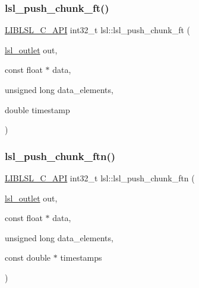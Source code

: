 \subsubsection{\texorpdfstring{lsl\+\_\+push\+\_\+chunk\+\_\+ft()}{lsl\_push\_chunk\_ft()}}
{\footnotesize\ttfamily \hyperlink{lsl__cpp_8h_aafd0ef1813e8be84a1420c4f1df64615}{L\+I\+B\+L\+S\+L\+\_\+\+C\+\_\+\+A\+PI} int32\+\_\+t lsl\+::lsl\+\_\+push\+\_\+chunk\+\_\+ft (\begin{DoxyParamCaption}\item[{\hyperlink{namespacelsl_abcf512b0f66dacf86c10b165995fd50b}{lsl\+\_\+outlet}}]{out,  }\item[{const float $\ast$}]{data,  }\item[{unsigned long}]{data\+\_\+elements,  }\item[{double}]{timestamp }\end{DoxyParamCaption})}

\mbox{\label{namespacelsl_aee7313f1b6a8c88e7bdfc5f133986aaa}} 
\subsubsection{\texorpdfstring{lsl\+\_\+push\+\_\+chunk\+\_\+ftn()}{lsl\_push\_chunk\_ftn()}}
{\footnotesize\ttfamily \hyperlink{lsl__cpp_8h_aafd0ef1813e8be84a1420c4f1df64615}{L\+I\+B\+L\+S\+L\+\_\+\+C\+\_\+\+A\+PI} int32\+\_\+t lsl\+::lsl\+\_\+push\+\_\+chunk\+\_\+ftn (\begin{DoxyParamCaption}\item[{\hyperlink{namespacelsl_abcf512b0f66dacf86c10b165995fd50b}{lsl\+\_\+outlet}}]{out,  }\item[{const float $\ast$}]{data,  }\item[{unsigned long}]{data\+\_\+elements,  }\item[{const double $\ast$}]{timestamps }\end{DoxyParamCaption})}

\mbox{\label{namespacelsl_a5bb763124a2b2e74423b5c382a600b30}} 
